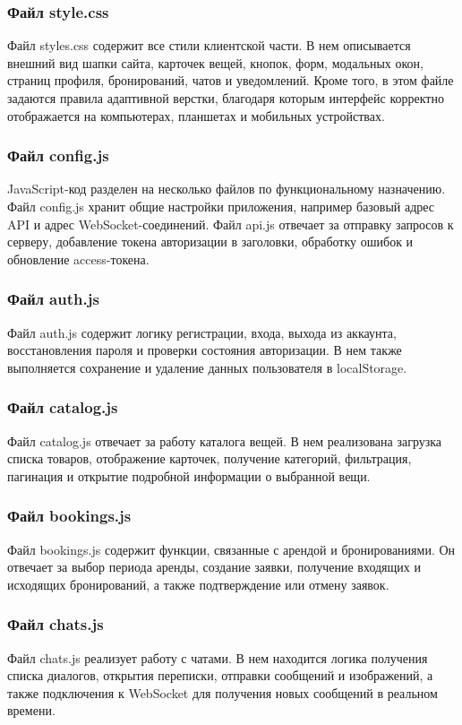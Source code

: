 \subsubsection{Файл style.css}
Файл styles.css содержит все стили клиентской части. В нем описывается внешний вид шапки сайта, карточек вещей, кнопок, форм, модальных окон, страниц профиля, бронирований, чатов и уведомлений. Кроме того, в этом файле задаются правила адаптивной верстки, благодаря которым интерфейс корректно отображается на компьютерах, планшетах и мобильных устройствах.

\subsubsection{Файл config.js}
JavaScript-код разделен на несколько файлов по функциональному назначению. Файл config.js хранит общие настройки приложения, например базовый адрес API и адрес WebSocket-соединений. Файл api.js отвечает за отправку запросов к серверу, добавление токена авторизации в заголовки, обработку ошибок и обновление access-токена.

\subsubsection{Файл auth.js}
Файл auth.js содержит логику регистрации, входа, выхода из аккаунта, восстановления пароля и проверки состояния авторизации. В нем также выполняется сохранение и удаление данных пользователя в localStorage.

\subsubsection{Файл catalog.js}
Файл catalog.js отвечает за работу каталога 
вещей. В нем реализована загрузка списка товаров, отображение карточек, получение категорий, фильтрация, пагинация и открытие подробной информации о выбранной вещи.

\subsubsection{Файл bookings.js}
Файл bookings.js содержит функции, связанные с арендой и бронированиями. Он отвечает за выбор периода аренды, создание заявки, получение входящих и исходящих бронирований, а также подтверждение или отмену заявок.

\subsubsection{Файл chats.js}
Файл chats.js реализует работу с чатами. В нем находится логика получения списка диалогов, открытия переписки, отправки сообщений и изображений, а также подключения к WebSocket для получения новых сообщений в реальном времени.

